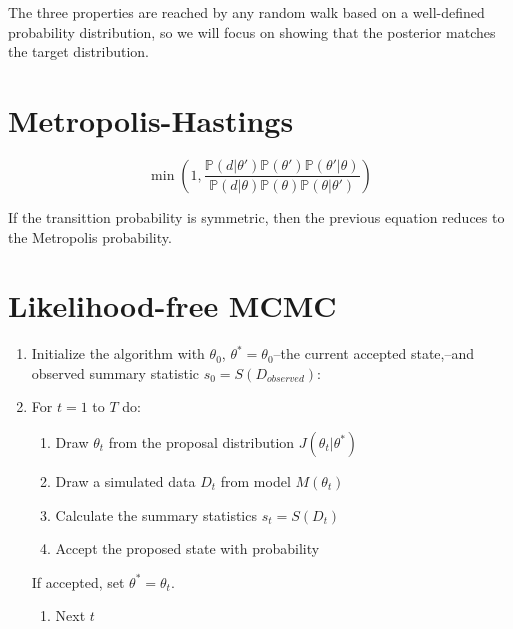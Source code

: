 \documentclass[
]{book}
\providecommand{\tightlist}{%
  \setlength{\itemsep}{0pt}\setlength{\parskip}{0pt}}
\begin{document}
The three properties are reached by any random walk based on a well-defined
probability distribution, so we will focus on showing that the posterior matches
the target distribution.

\hypertarget{metropolis-hastings}{%
\section{Metropolis-Hastings}\label{metropolis-hastings}}

\[
\min\left(1, \frac{\mathbb{P}{\left(d|\theta'\right)}\mathbb{P}{\left(\theta'\right)}\mathbb{P}{\left(\theta'|\theta\right)}}{\mathbb{P}{\left(d|\theta\right)}\mathbb{P}{\left(\theta\right)}\mathbb{P}{\left(\theta|\theta'\right)}}\right)
\]

If the transittion probability is symmetric, then the previous equation reduces
to the Metropolis probability.

\hypertarget{likelihood-free-mcmc}{%
\section{Likelihood-free MCMC}\label{likelihood-free-mcmc}}

\begin{enumerate}
\def\labelenumi{\arabic{enumi}.}
\item
  Initialize the algorithm with \(\theta_0\), \(\theta^* =\theta_0\)--the current accepted
  state,--and observed summary statistic \(s_0 = S(D_{observed})\):
\item
  For \(t = 1\) to \(T\) do:

  \begin{enumerate}
  \def\labelenumii{\alph{enumii}.}
  \item
    Draw \(\theta_t\) from the proposal distribution \(J(\theta_t|\theta^*)\)
  \item
    Draw a simulated data \(D_t\) from model \(M(\theta_t)\)
  \item
    Calculate the summary statistics \(s_t = S(D_t)\)
  \item
    Accept the proposed state with probability
  \end{enumerate}

  If accepted, set \(\theta^* = \theta_t\).

  \begin{enumerate}
  \def\labelenumii{\alph{enumii}.}
  \setcounter{enumii}{4}
  \tightlist
  \item
    Next \(t\)
  \end{enumerate}
\end{enumerate}
\end{document}
